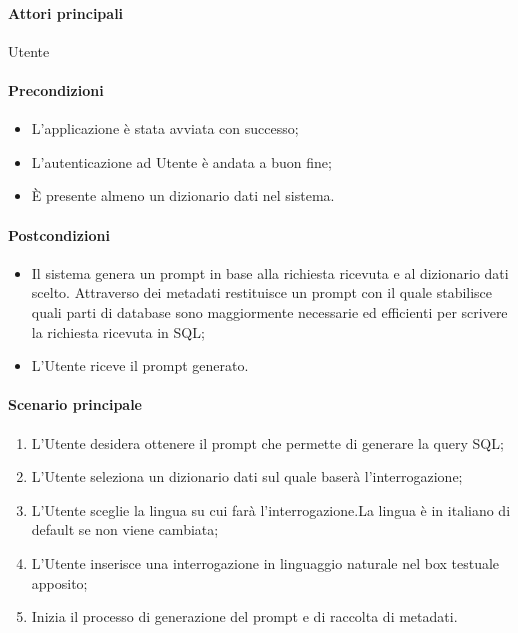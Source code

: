 \paragraph*{Attori principali} Utente

\paragraph*{Precondizioni}
\begin{itemize}
  \item L'applicazione è stata avviata con successo;
  \item L’autenticazione ad Utente è andata a buon fine;
  \item È presente almeno un dizionario dati nel sistema.
\end{itemize}

\paragraph*{Postcondizioni}
\begin{itemize}
  \item Il sistema genera un prompt in base alla richiesta ricevuta e al dizionario dati scelto. Attraverso dei metadati restituisce un prompt con il quale stabilisce quali parti di database sono maggiormente necessarie ed efficienti per scrivere la richiesta ricevuta in SQL;
  \item L’Utente riceve il prompt generato.
\end{itemize}

\paragraph*{Scenario principale}
\begin{enumerate}
  \item L’Utente desidera ottenere il prompt che permette di generare la query SQL;
  \item L’Utente seleziona un dizionario dati sul quale baserà l’interrogazione;
  \item L’Utente sceglie la lingua su cui farà l’interrogazione.La lingua è in italiano di default se non viene cambiata;
  \item L’Utente inserisce una interrogazione in linguaggio naturale nel box testuale apposito;
  \item Inizia il processo di generazione del prompt e di raccolta di metadati.
\end{enumerate}


